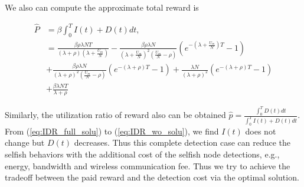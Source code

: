We also can compute the approximate total reward is
\begin{small}
\begin{equation}
\nonumber
\begin{aligned}
\hat{P} &= \beta \int_{0}^{T} I(t) + D(t) dt, \\
& = \frac{\beta \rho \lambda N T}{ (\lambda + \rho)(\lambda + \frac{U_{m}}{N}) }
- \frac{\beta \rho \lambda N}{ {(\lambda + \frac{U_{m}}{N})}^{2} (\frac{U_{m}}{N} - \rho)}
(e^{-(\lambda + \frac{U_{m}}{N})T} - 1 ) \\
&+ \frac{\beta \rho \lambda N }{ {(\lambda + \rho)}^{2} (\frac{U_{m}}{N} - \rho) }
(e^{-(\lambda + \rho)T} - 1 )
+ \frac{ \lambda N }{ (\lambda + \rho)^2 } (e^{-(\lambda + \rho)T} - 1 ) \\
& + \frac{ \beta \lambda N T }{ \lambda + \rho }
\end{aligned}
\end{equation}
\end{small}
Similarly, the utilization ratio of reward also can be obtained
$\hat{p} = \frac{\int_{0}^{T} D(t) dt}{\int_{0}^{T} I(t) + D(t) dt}$.
From (\ref{eq:IDR_full_solu}) to (\ref{eq:IDR_wo_solu}),
we find $I(t)$ does not change but $D(t)$ decreases.
Thus this complete detection case can reduce the selfish behaviors
with the additional cost of the selfish node detections,
e.g., energy, bandwidth and wireless communication fee.
Thus we try to achieve the tradeoff between the paid reward
and the detection cost
via the optimal solution.
